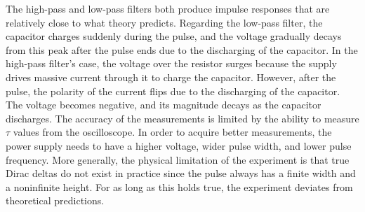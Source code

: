 The high-pass and low-pass filters both produce impulse responses that are relatively close to what theory predicts. Regarding the low-pass filter, the capacitor charges suddenly during the pulse, and the voltage gradually decays from this peak after the pulse ends due to the discharging of the capacitor. In the high-pass filter's case, the voltage over the resistor surges because the supply drives massive current through it to charge the capacitor. However, after the pulse, the polarity of the current flips due to the discharging of the capacitor. The voltage becomes negative, and its magnitude decays as the capacitor discharges. The accuracy of the measurements is limited by the ability to measure $\tau$ values from the oscilloscope. In order to acquire better measurements, the power supply needs to have a higher voltage, wider pulse width, and lower pulse frequency. More generally, the physical limitation of the experiment is that true Dirac deltas do not exist in practice since the pulse always has a finite width and a noninfinite height. For as long as this holds true, the experiment deviates from theoretical predictions.
